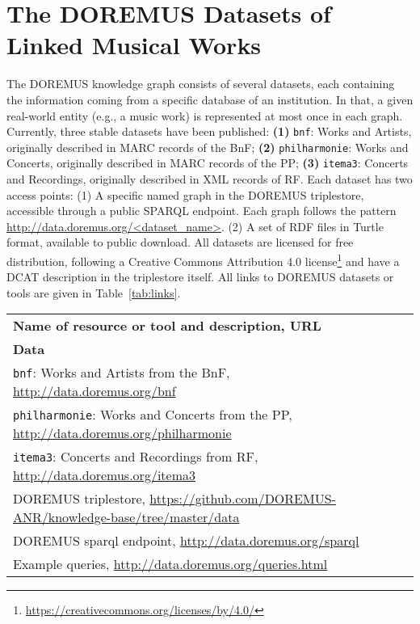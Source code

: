 \section{The DOREMUS Datasets of Linked Musical Works} \label{sec:doremus}
The DOREMUS knowledge graph consists of several datasets, each  containing the information coming from a specific database of an institution. In that, a given real-world entity (e.g., a music work) is represented at most once in each graph. %
Currently, three stable datasets have been published: {\bf (1)} \texttt{bnf}: Works and Artists, originally described in MARC records of the BnF; {\bf (2)} \texttt{philharmonie}: Works and Concerts, originally described in MARC records of the PP; {\bf (3)} \texttt{itema3}: Concerts and Recordings, originally described in XML records of RF. Each dataset has two access points: (1) A specific named graph in the DOREMUS triplestore, accessible through a public SPARQL endpoint. Each graph follows the pattern \url{http://data.doremus.org/<dataset_name>}. (2) A set of RDF files in Turtle format, available to public download. All datasets are licensed for free distribution, following a Creative Commons Attribution 4.0 license\footnote{\url{https://creativecommons.org/licenses/by/4.0/}} and have a DCAT description in the triplestore itself. All links to DOREMUS datasets or tools are given in Table~\ref{tab:links}. \begin{table}[htbp]
\begin{center} \scriptsize
\begin{tabular}{ll}
{\bf Name of resource or tool and description,  URL } \\ %
 {\bf Data}   \\ %
{\tt bnf}: Works and Artists from the BnF,   \url{http://data.doremus.org/bnf}  \\ 
{\tt philharmonie}: Works and Concerts from the PP,  \url{http://data.doremus.org/philharmonie}  \\ 
{\tt itema3}: Concerts and Recordings from RF,  \url{http://data.doremus.org/itema3}  \\ DOREMUS triplestore,  \url{https://github.com/DOREMUS-ANR/knowledge-base/tree/master/data}  \\ 
DOREMUS sparql endpoint,   \url{http://data.doremus.org/sparql}  \\ 
Example queries,  \url{http://data.doremus.org/queries.html}  \\ 

\end{tabular}
\end{center}
\end{table}
